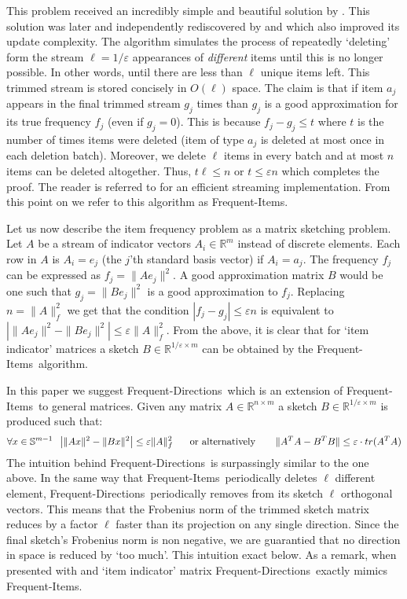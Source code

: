 \documentclass[]{article}
\newcommand{\R}{{\mathbb R}}
\renewcommand{\S}{{\mathbb S}}
\newcommand{\eps}{\varepsilon}
\newcommand{\FI}{Frequent-Items}
\newcommand{\FD}{Frequent-Directions}
\begin{document}
This problem received an incredibly simple and beautiful solution by \cite{Misra1982}.
This solution was later and independently rediscovered 
by \cite{DemaineLopezAlejandroMunro2002} and \cite{Karp03} which also improved its update complexity.
The algorithm simulates the process of repeatedly `deleting' form the 
stream $\ell = 1/\eps$ appearances of {\it different} items until this is no longer possible. 
In other words, until there are less than $\ell$ unique items left. 
This trimmed stream is stored concisely in $O(\ell)$ space.
The claim is that if item $a_j$ appears in the final trimmed stream $g_j$ times 
than $g_j$ is a good approximation for its true frequency $f_j$ (even if $g_j=0$).
This is because $f_j - g_j \le t$ where $t$ is the number of times items were deleted (item of type $a_j$ is deleted at most once in each deletion batch). 
Moreover, we delete $\ell$ items in every batch and at most $n$ items can be deleted altogether. Thus, $t\ell \le n$ or $t \le \eps n$ which completes the proof.
The reader is referred to \cite{Karp03} for an efficient streaming implementation.
From this point on we refer to this algorithm as \FI. 






Let us now describe the item frequency problem as a matrix sketching problem. 
Let $A$ be a stream of indicator vectors $A_{i} \in \R^{m}$ instead of discrete elements.
Each row in $A$ is $A_i = e_j$ (the $j$'th standard basis vector) if $A_i = a_j$.
The frequency $f_j$ can be expressed as $f_j = \|A e_j\|^{2}$. 
A good approximation matrix $B$ would be one such that $g_j = \|B e_j\|^{2}$ is a good approximation to $f_j$.
Replacing $n= \|A\|_{f}^{2}$ we get that the condition $| f_j - g_j | \le \eps n$
is equivalent to $|\|Ae_j\|^2 - \|Be_j\|^2| \le \eps \|A\|_{f}^{2}$. 
From the above, it is clear that for `item indicator' matrices a sketch $B \in \R^{1/\eps \times m}$ can be
obtained by the \FI~algorithm.

In this paper we suggest \FD~which is an extension of \FI~to general matrices. 
Given any matrix $A \in \R^{n \times m}$ a sketch $B \in \R^{1/\eps \times m}$ is produced such that:
\[
\forall x \in \S^{m-1} \;\; \left|\|Ax\|^2 - \|Bx\|^2\right|  \le \eps \|A\|_{f}^{2} \mbox{\;\;\;\;\; or alternatively \;\; \;\;\;}  \|A^{T}A -  B^{T}B\| \le \eps\cdot tr(A^{T}A)
\]
The intuition behind \FD~is surpassingly similar to the one above.
In the same way that \FI~periodically deletes $\ell$ different element, \FD~periodically removes from its sketch $\ell$ orthogonal vectors.
This means that the Frobenius norm of the trimmed sketch matrix reduces by a factor $\ell$ faster than its projection on any single direction.
Since the final sketch's Frobenius norm is non negative, we are guarantied that no direction in space is reduced by `too much'. 
This intuition exact below.
As a remark, when presented with and `item indicator' matrix \FD~exactly mimics \FI.
\end{document}

